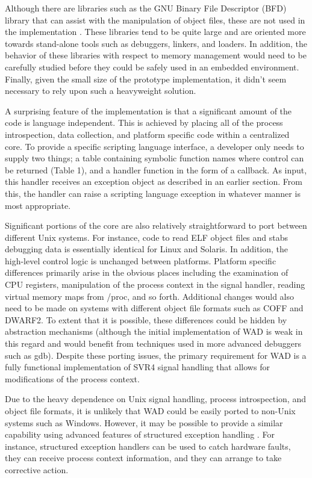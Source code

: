 Although there are libraries such as the GNU Binary File Descriptor
(BFD) library that can assist with the manipulation of object files,
these are not used in the implementation \cite{bfd}.  These
libraries tend to be quite large and are oriented more towards
stand-alone tools such as debuggers, linkers, and loaders.  In addition,
the behavior of these libraries with respect to memory management
would need to be carefully studied before they could be safely used in
an embedded environment. Finally, given the small size of the prototype 
implementation, it didn't seem necessary to rely upon such a 
heavyweight solution.

A surprising feature of the implementation is that a significant
amount of the code is language independent.  This is achieved by
placing all of the process introspection, data collection, and
platform specific code within a centralized core.  To provide a
specific scripting language interface, a developer only needs to
supply two things; a table containing symbolic function names where
control can be returned (Table 1), and a handler function in the form
of a callback.  As input, this handler receives an exception object as
described in an earlier section.  From this, the handler can
raise a scripting language exception in whatever manner is most
appropriate.

Significant portions of the core are also relatively straightforward
to port between different Unix systems.  For instance, code to read
ELF object files and stabs debugging data is essentially identical for
Linux and Solaris.  In addition, the high-level control logic is
unchanged between platforms.  Platform specific differences primarily
arise in the obvious places including the examination of CPU
registers, manipulation of the process context in the signal handler,
reading virtual memory maps from /proc, and so forth.  Additional
changes would also need to be made on systems with different object
file formats such as COFF and DWARF2.  To extent that it is possible,
these differences could be hidden by abstraction mechanisms (although
the initial implementation of WAD is weak in this regard and would
benefit from techniques used in more advanced debuggers such as gdb).
Despite these porting issues, the primary requirement for WAD is a fully
functional implementation of SVR4 signal handling that allows for
modifications of the process context.

Due to the heavy dependence on Unix signal handling, process
introspection, and object file formats, it is unlikely that WAD could
be easily ported to non-Unix systems such as Windows.  However, it may
be possible to provide a similar capability using advanced features of
structured exception handling \cite{seh}.  For instance, structured
exception handlers can be used to catch hardware faults, they can
receive process context information, and they can arrange to take
corrective action.  

